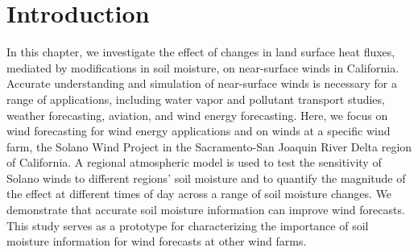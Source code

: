 
%
%
%
%
%

\section{Introduction}

In this chapter, we investigate the effect of changes in land surface heat fluxes, mediated by modifications in soil moisture, on near-surface winds in California.  Accurate understanding and simulation of near-surface winds is necessary for a range of applications, including water vapor and pollutant transport studies, weather forecasting, aviation, and wind energy forecasting.  Here, we focus on wind forecasting for wind energy applications and on winds at a specific wind farm, the Solano Wind Project in the Sacramento-San Joaquin River Delta region of California.  A regional atmospheric model is used to test the sensitivity of Solano winds to different regions' soil moisture and to quantify the magnitude of the effect at different times of day across a range of soil moisture changes.  We demonstrate that accurate soil moisture information can improve wind forecasts.  This study serves as a prototype for characterizing the importance of soil moisture information for wind forecasts at other wind farms.

